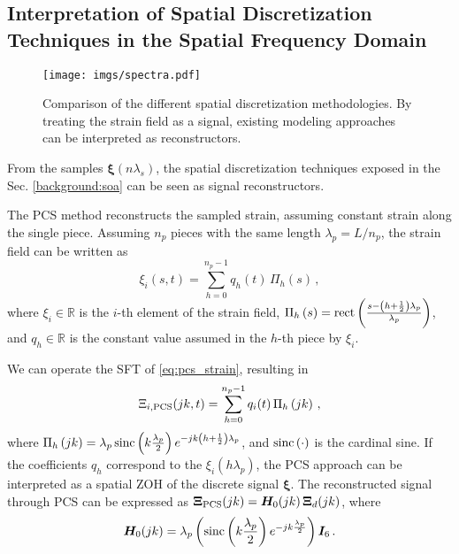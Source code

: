 \subsection{Interpretation of Spatial Discretization Techniques in the Spatial Frequency Domain}
%     
\begin{figure*}
    \centering
    \texttt{[image: imgs/spectra.pdf]}
    \caption{Comparison of the different spatial discretization methodologies. By treating the strain field as a signal, existing modeling approaches can be interpreted as reconstructors.}
    \label{fig:spectra}
\end{figure*}
%
From the samples $\bm{\xi}(n \lambda_s)$, the spatial discretization techniques exposed in the Sec. \ref{background:soa} can be seen as signal reconstructors.

The \ac{PCS} method reconstructs the sampled strain, assuming constant strain along the single piece. Assuming $n_p$ pieces with the same length $\lambda_p = L / n_p$, the strain field can be written as
\begin{equation} \label{eq:pcs_strain}
    \xi_i(s, t) = \sum_{h = 0}^{n_{p} - 1} q_h(t) \, \Pi_h\left(s\right) \, ,
\end{equation}
where $\xi_i \in \mathbb{R}$ is the $i$-th element of the strain field,
$\Pi_h\left(s\right) =  \textnormal{rect}\left(\frac{s - \left(h + \frac{1}{2}\right) \lambda_p}{\lambda_p}\right)$, and $q_h \in \mathbb{R}$ is the constant value assumed in the $h$-th piece by $\xi_i$.

We can operate the \ac{SFT} of \eqref{eq:pcs_strain}, resulting in 
\begin{equation}
    \Xi_{i, \textnormal{PCS}}(jk, t) = \sum_{h = 0}^{n_p - 1} q_i(t) \, \Pi_h\left(jk\right) \, ,
\end{equation}
where $\Pi_h\left(jk\right) = \lambda_p \, \textnormal{sinc}\left(k \frac{\lambda_p}{2}\right) e^{-j k \left(h + \frac{1}{2}\right)\lambda_p}$, and $\textnormal{sinc}\left(\cdot\right)$ is the cardinal sine.
If the coefficients $q_h$ correspond to the $\xi_i(h \lambda_p)$, the \ac{PCS} approach can be interpreted as a spatial \ac{ZOH} of the discrete signal $\bm{\xi}$. The reconstructed signal through \ac{PCS} can be expressed as $\bm{\Xi}_{\textnormal{PCS}}(jk) = \bm{H}_0 (jk)  \, \bm{\Xi}_d(jk)$, where
\begin{equation}
    \bm{H}_0(jk) =  \lambda_p \left(\textnormal{sinc}\left(k \frac{\lambda_p}{2}\right) e^{-j k \frac{\lambda_p}{2}}\right) \bm{I}_{6} \, .
\end{equation}

